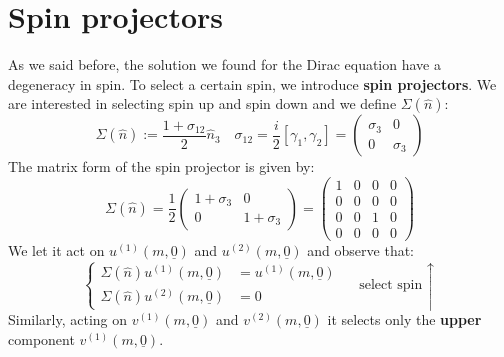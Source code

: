 \documentclass[../main.tex]{subfiles}
\begin{document}
\section{Spin projectors}
As we said before, the solution we found for the Dirac equation have a degeneracy in spin. To select a certain spin, we introduce \textbf{spin projectors}. We are interested in selecting spin up and spin down and we define $\Sigma(\hat{n})$:
\[
\Sigma(\hat{n}):=\frac{1+\sigma_{12}}{2}\hat{n}_3
\quad
\sigma_{12}=\frac{i}{2}[\gamma_1,\gamma_2]=\left(\begin{array}{cc}
    \sigma_3 & 0 \\
    0 & \sigma_3
\end{array}\right)
\]
The matrix form of the spin projector is given by:
\[
\Sigma(\hat{n})=\frac{1}{2}\left(\begin{array}{cc}
    1+\sigma_3 & 0 \\
    0 & 1+\sigma_3
\end{array}\right)=\left(\begin{array}{cccc}
    1 & 0 & 0 & 0 \\
    0 & 0 & 0 & 0 \\
    0 & 0 & 1 & 0 \\
    0 & 0 & 0 & 0 
\end{array}\right)
\]
We let it act on $u^{(1)}(m,\underline{0})$ and $u^{(2)}(m,\underline{0})$ and observe that:
\[
\left\{
\begin{aligned}
\Sigma(\hat{n})u^{(1)}(m,\underline{0})&=u^{(1)}(m,\underline{0}) \\
\Sigma(\hat{n})u^{(2)}(m,\underline{0})&=0
\end{aligned}
\right.
\quad \text{select spin $\uparrow$}
\]
Similarly, acting on $v^{(1)}(m,\underline{0})$ and $v^{(2)}(m,\underline{0})$ it selects only the \textbf{upper} component $v^{(1)}(m,\underline{0})$.
\end{document}
